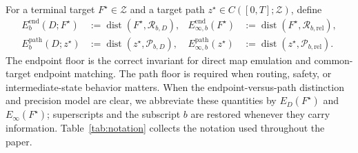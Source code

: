 \documentclass[twoside,11pt]{article}
\newcommand{\Z}{\mathcal{Z}}
\newcommand{\Rel}{\mathrm{rel}}
\newcommand{\dist}{\operatorname{dist}}
\newcommand{\RR}{\mathscr{R}}
\begin{document}
For a terminal target $F^\star\in\Z$ and a target path $z^\star\in C([0,T];\Z)$, define
\begin{align}
 E_b^{\mathrm{end}}(D;F^\star)
 &:=\dist(F^\star,\RR_{b,D}),
 &
 E_{\infty,b}^{\mathrm{end}}(F^\star)
 &:=\dist(F^\star,\RR_{b,\Rel}),
 \label{eq:end-errors-main}\\
 E_b^{\mathrm{path}}(D;z^\star)
 &:=\dist(z^\star,\mathscr P_{b,D}),
 &
 E_{\infty,b}^{\mathrm{path}}(z^\star)
 &:=\dist(z^\star,\mathscr P_{b,\Rel}).
 \label{eq:path-errors-main}
\end{align}
The endpoint floor is the correct invariant for direct map emulation and common-target endpoint matching.  The path floor is required when routing, safety, or intermediate-state behavior matters.  When the endpoint-versus-path distinction and precision model are clear, we abbreviate these quantities by $E_D(F^\star)$ and $E_\infty(F^\star)$; superscripts and the subscript $b$ are restored whenever they carry information.  Table~\ref{tab:notation} collects the notation used throughout the paper.
\end{document}
